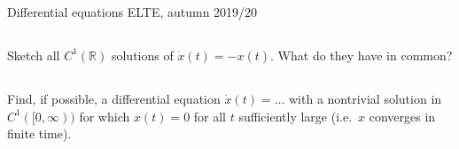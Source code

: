 \documentclass[12pt,a4paper]{article}
\begin{document}
    Differential equations
    \hfill
    ELTE, autumn 2019/20
    
    
    \subsection{}
    
    Sketch all $C^1(\mathbb{R})$ solutions 
    of $\dot{x}(t) = -x(t)$.
    What do they have in common?
    
    
    \subsection{}
    
    Find, if possible,
    a differential equation $\dot{x}(t) = \ldots$
    with a nontrivial solution in $C^1([0, \infty))$
    for which
    $x(t) = 0$ for all $t$ sufficiently large 
    (i.e.~$x$ converges in finite time).

    
    \subsection{}
    
\end{document}
